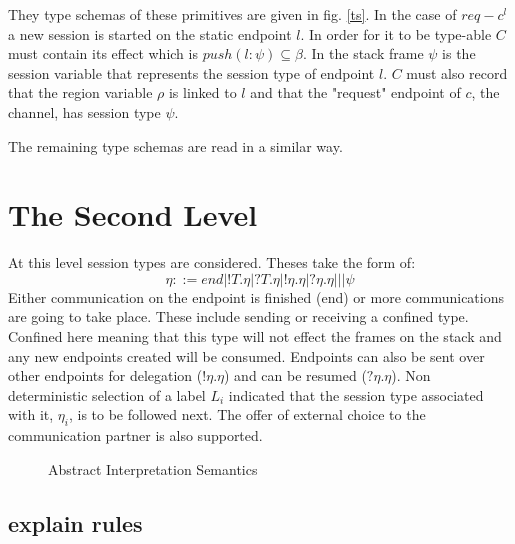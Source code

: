 They type schemas of these primitives are given in fig. \ref{ts}. In the case of $req-c^l$ a new session is started on the static endpoint $l$. In order for it to be type-able $C$ must contain its effect which is $push(l:\psi) \subseteq \beta$. In the stack frame $\psi$ is the session variable that represents the session type of endpoint $l$. $C$ must also record that the region variable $\rho$ is linked to $l$ and that the "request" endpoint of $c$, the channel, has session type $\psi$. 

The remaining type schemas are read in a similar way. 

\section{The Second Level} \label{level2}

At this level session types are considered. Theses take the form of: $$ \eta ::= end | !T.\eta | ?T.\eta | !\eta.\eta | ?\eta.\eta | | | \psi $$ Either communication on the endpoint is finished (end) or more communications are going to take place. These include sending or receiving a confined type. Confined here meaning that this type will not effect the frames on the stack and any new endpoints created will be consumed. Endpoints can also be sent over other endpoints for delegation ($!\eta.\eta$) and can be resumed ($?\eta.\eta$). Non deterministic selection of a label $L_i$ indicated that the session type associated with it, $\eta_i$, is to be followed next. The offer of external choice to the communication partner is also supported. 

\begin{figure}
\caption{Abstract Interpretation Semantics}
\label{rules2}
\end{figure}

\subsection{explain rules}
